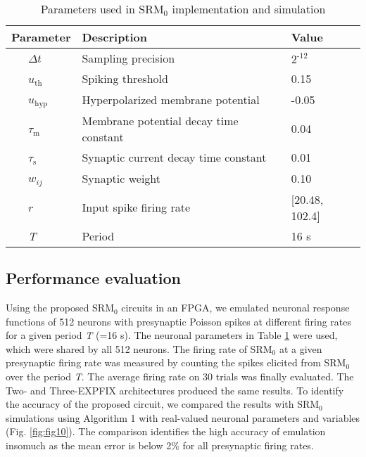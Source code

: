 \documentclass[10pt,journal]{IEEEtran}
\begin{document}
\begin{table}[tb]\centering
\caption{\label{tab:tab4} Parameters used in SRM$_\textrm{0}$ implementation and simulation}
\renewcommand{\arraystretch}{1.2} 
\begin{threeparttable}\small
\begin{tabular}[ht]{lp{4.2cm}l} \toprule \toprule
    \textbf{Parameter} 
    &\textbf{Description} &\textbf{Value} \\\midrule
    ~~~$\Delta t$ 
        &Sampling precision &$2^\textrm{-12}$\\
    ~~~$u_\textrm{th}$ 
        &Spiking threshold&0.15\\
    ~~~$u_\textrm{hyp}$ 
        &Hyperpolarized membrane potential &-0.05\\
    ~~~$\tau_\textrm{m}$ 
        &Membrane potential decay time constant &0.04\\
    ~~~$\tau_\textrm{s}$ 
        &Synaptic current decay time constant &0.01\\
    ~~~$w_\textit{ij}$ &Synaptic weight &0.10\\
    ~~~$r$ &Input spike firing rate &[20.48, 102.4]\\
    ~~~\textit{T} &Period &16 s\\ \bottomrule \bottomrule
\end{tabular}
\end{threeparttable}
\end{table}

\subsection{Performance evaluation}
\label{subsec:performance} 
Using the proposed SRM$_\textrm{0}$ circuits in an FPGA, we emulated neuronal response functions of 512 neurons with presynaptic Poisson spikes at different firing rates for a given period \textit{T} (=16 s). 
The neuronal parameters in Table \ref{tab:tab4} were used, which were shared by all 512 neurons. 
The firing rate of SRM$_\textrm{0}$ at a given presynaptic firing rate was measured by counting the spikes elicited from SRM$_\textrm{0}$ over the period \textit{T}.
The average firing rate on 30 trials was finally evaluated. 
The Two- and Three-EXP\textunderscore FIX architectures produced the same results.
To identify the accuracy of the proposed circuit, we compared the results with SRM$_\textrm{0}$ simulations using Algorithm 1 with real-valued neuronal parameters and variables (Fig. \ref{fig:fig10}).
The comparison identifies the high accuracy of emulation insomuch as the mean error is below 2\% for all presynaptic firing rates. 
\end{document}
